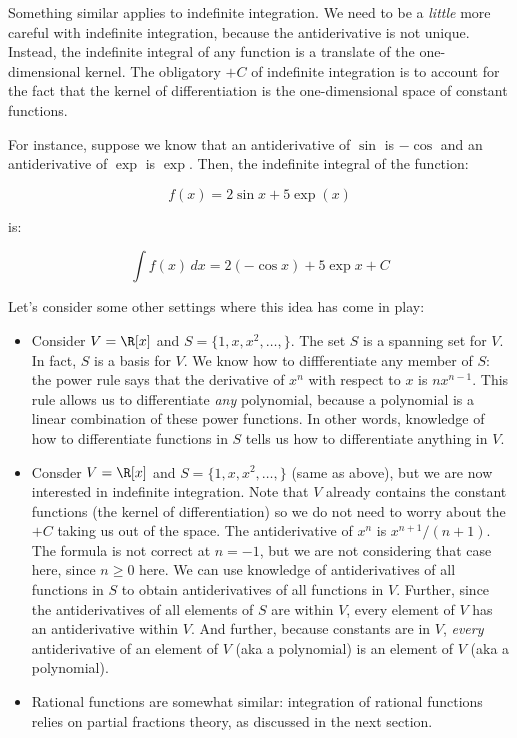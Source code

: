\documentclass[10pt]{amsart}
\begin{document}
Something similar applies to indefinite integration. We need to be a
{\em little} more careful with indefinite integration, because the
antiderivative is not unique. Instead, the indefinite integral of any
function is a translate of the one-dimensional kernel. The obligatory
$+C$ of indefinite integration is to account for the fact that the
kernel of differentiation is the one-dimensional space of constant
functions.

For instance, suppose we know that an antiderivative of $\sin$ is
$-\cos$ and an antiderivative of $\exp$ is $\exp$. Then, the
indefinite integral of the function:

$$f(x) = 2\sin x + 5 \exp(x)$$

is:

$$\int f(x) \, dx = 2(-\cos x) + 5\exp x + C$$

Let's consider some other settings where this idea has come in play:

\begin{itemize}
\item Consider $V = \R[x]$ and $S = \{1,x,x^2,\dots,\}$. The set $S$
  is a spanning set for $V$. In fact, $S$ is a basis for $V$. We know
  how to diffferentiate any member of $S$: the power rule says that
  the derivative of $x^n$ with respect to $x$ is $nx^{n-1}$. This rule
  allows us to differentiate {\em any} polynomial, because a
  polynomial is a linear combination of these power functions. In
  other words, knowledge of how to differentiate functions in $S$
  tells us how to differentiate anything in $V$.
\item Consder $V = \R[x]$ and $S = \{ 1,x,x^2,\dots,\}$ (same as
  above), but we are now interested in indefinite integration. Note
  that $V$ already contains the constant functions (the kernel of
  differentiation) so we do not need to worry about the $+C$ taking us
  out of the space. The antiderivative of $x^n$ is
  $x^{n+1}/(n+1)$. The formula is not correct at $n = -1$, but we are
  not considering that case here, since $n \ge 0$ here. We can use
  knowledge of antiderivatives of all functions in $S$ to obtain
  antiderivatives of all functions in $V$. Further, since the
  antiderivatives of all elements of $S$ are within $V$, every element
  of $V$ has an antiderivative within $V$. And further, because
  constants are in $V$, {\em every} antiderivative of an element of
  $V$ (aka a polynomial) is an element of $V$ (aka a polynomial).
\item Rational functions are somewhat similar: integration of rational
  functions relies on partial fractions theory, as discussed in the
  next section.
\end{itemize}
\end{document}

